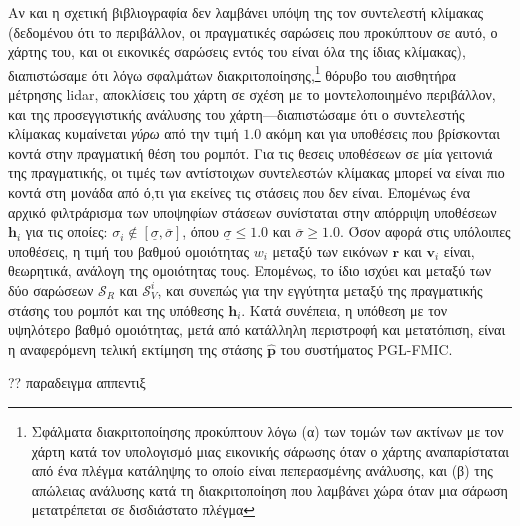 Αν και η σχετική βιβλιογραφία δεν λαμβάνει υπόψη της τον συντελεστή κλίμακας
(δεδομένου ότι το περιβάλλον, οι πραγματικές σαρώσεις που προκύπτουν σε αυτό, ο
χάρτης του, και οι εικονικές σαρώσεις εντός του είναι όλα της ίδιας κλίμακας),
διαπιστώσαμε ότι λόγω σφαλμάτων διακριτοποίησης,\footnote{Σφάλματα
διακριτοποίησης προκύπτουν λόγω (α) των τομών των ακτίνων με τον χάρτη κατά τον
υπολογισμό μιας εικονικής σάρωσης όταν ο χάρτης αναπαρίσταται από ένα πλέγμα
κατάληψης το οποίο είναι πεπερασμένης ανάλυσης, και (β) της απώλειας ανάλυσης
κατά τη διακριτοποίηση που λαμβάνει χώρα όταν μια σάρωση μετατρέπεται σε
δισδιάστατο πλέγμα} θόρυβο του αισθητήρα μέτρησης lidar, αποκλίσεις του χάρτη
σε σχέση με το μοντελοποιημένο περιβάλλον, και της προσεγγιστικής ανάλυσης του
χάρτη---διαπιστώσαμε ότι ο συντελεστής κλίμακας κυμαίνεται \textit{γύρω} από
την τιμή $1.0$ ακόμη και για υποθέσεις που βρίσκονται κοντά στην πραγματική
θέση του ρομπότ. Για τις θεσεις υποθέσεων σε μία γειτονιά της πραγματικής, οι
τιμές των αντίστοιχων συντελεστών κλίμακας μπορεί να είναι πιο κοντά στη μονάδα
από ό,τι για εκείνες τις στάσεις που δεν είναι. Επομένως ένα αρχικό φιλτράρισμα
των υποψηφίων στάσεων συνίσταται στην απόρριψη υποθέσεων $\bm{h}_i$ για τις
οποίες: $\sigma_i \not\in [\underline{\sigma}, \overline{\sigma}]$, όπου
$\underline{\sigma} \leq 1.0$ και $\overline{\sigma} \geq 1.0$. Όσον αφορά στις
υπόλοιπες υποθέσεις, η τιμή του βαθμού ομοιότητας $w_i$ μεταξύ των εικόνων
$\bm{r}$ και $\bm{v}_i$ είναι, θεωρητικά, ανάλογη της ομοιότητας τους.
Επομένως, το ίδιο ισχύει και μεταξύ των δύο σαρώσεων $\mathcal{S}_R$ και
$\mathcal{S}_V^i$, και συνεπώς για την εγγύτητα μεταξύ της πραγματικής στάσης
του ρομπότ και της υπόθεσης $\bm{h}_i$.  Κατά συνέπεια, η υπόθεση με τον
υψηλότερο βαθμό ομοιότητας, μετά από κατάλληλη περιστροφή και μετατόπιση, είναι
η αναφερόμενη τελική εκτίμηση της στάσης $\bm{\hat{p}}$ του συστήματος
PGL-FMIC.

?? παραδειγμα αππεντιξ
